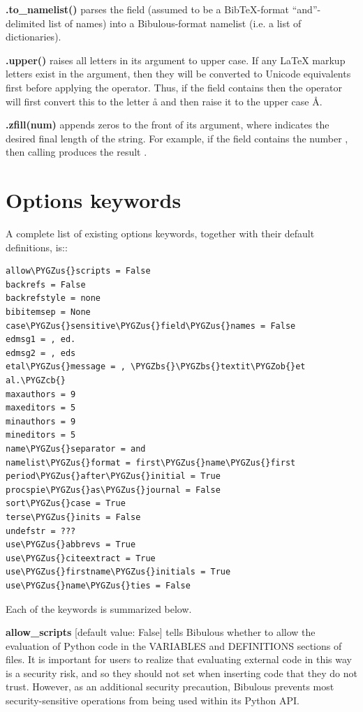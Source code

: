 \documentclass[letterpaper,10pt,english]{sphinxmanual}
\def\PYGZbs{\char`\\}
\def\PYGZus{\char`\_}
\def\PYGZob{\char`\{}
\def\PYGZcb{\char`\}}
\begin{document}
\textbf{.to\_namelist()} parses the field (assumed to be a BibTeX-format ``and''-delimited list of names) into a Bibulous-format namelist (i.e. a list of dictionaries).

\textbf{.upper()} raises all letters in its argument to upper case. If any LaTeX markup letters exist in the argument, then they will be converted to Unicode equivalents first before applying the operator. Thus, if the field  contains  then the operator will first convert this to the letter å and then raise it to the upper case Å.

\textbf{.zfill(num)} appends zeros to the front of its argument, where  indicates the desired final length of the string. For example, if the field  contains the number , then calling  produces the result .


\section{Options keywords}
\label{guidelines_for_writing_style_templates:options-keywords}
A complete list of existing options keywords, together with their default definitions, is::

\begin{Verbatim}[commandchars=\\\{\}]
allow\PYGZus{}scripts = False
backrefs = False
backrefstyle = none
bibitemsep = None
case\PYGZus{}sensitive\PYGZus{}field\PYGZus{}names = False
edmsg1 = , ed.
edmsg2 = , eds
etal\PYGZus{}message = , \PYGZbs{}\PYGZbs{}textit\PYGZob{}et al.\PYGZcb{}
maxauthors = 9
maxeditors = 5
minauthors = 9
mineditors = 5
name\PYGZus{}separator = and
namelist\PYGZus{}format = first\PYGZus{}name\PYGZus{}first
period\PYGZus{}after\PYGZus{}initial = True
procspie\PYGZus{}as\PYGZus{}journal = False
sort\PYGZus{}case = True
terse\PYGZus{}inits = False
undefstr = ???
use\PYGZus{}abbrevs = True
use\PYGZus{}citeextract = True
use\PYGZus{}firstname\PYGZus{}initials = True
use\PYGZus{}name\PYGZus{}ties = False
\end{Verbatim}

Each of the keywords is summarized below.

\textbf{allow\_scripts} {[}default value: False{]} tells Bibulous whether to allow the evaluation of Python code in the VARIABLES and DEFINITIONS sections of  files. It is important for users to realize that evaluating external code in this way is a security risk, and so they should not set  when inserting code that they do not trust. However, as an additional security precaution, Bibulous prevents most security-sensitive operations from being used within its Python API.
\end{document}
